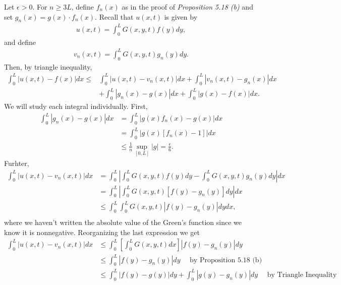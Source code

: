 \begin{questions}
\begin{solution}
Let $\epsilon>0$. For $n\geq 3L$, define $f_n(x)$ as in the proof of \textsl{Proposition 5.18 (b)} and set $g_n(x)=g(x)\cdot f_n(x)$. Recall that $u(x,t)$ is given by 
\begin{align*}
u(x,t)=\int_0^LG(x,y,t)f(y)dy,
\end{align*}
and define
\begin{align*}
v_n(x,t)=\int_0^LG(x,y,t)g_n(y)dy.
\end{align*}
Then, by triangle inequality,
\begin{align*}
\int_0^L|u(x,t)-f(x)|dx\leq& \int_0^L|u(x,t)-v_n(x,t)|dx+\int_0^L|v_n(x,t)-g_n(x)|dx\\
&+\int_0^L|g_n(x)-g(x)|dx+\int_0^L|g(x)-f(x)|dx.
\end{align*}
We will study each integral individually. First,
\begin{align*}
\int_0^L|g_n(x)-g(x)|dx&=\int_0^L|g(x)f_n(x)-g(x)|dx\\
&=\int_0^L|g(x)[f_n(x)-1]|dx\\
&\leq \frac{1}{n}\sup_{[0,L]}|g|=\frac{\epsilon}{6}.
\end{align*}
Furhter,
\begin{align*}
\int_0^L|u(x,t)-v_n(x,t)|dx&=\int_0^L\left|\int_0^LG(x,y,t)f(y)dy-\int_0^LG(x,y,t)g_n(y)dy\right|dx\\
&=\int_0^L\left|\int_0^LG(x,y,t)\left[f(y)-g_n(y)\right]dy\right|dx\\
&\leq\int_0^L\int_0^LG(x,y,t)\left|f(y)-g_n(y)\right|dydx,\\
\end{align*}
where we haven't written the absolute value of the Green's function since we know it is nonnegative. Reorganizing the last expression we get
\begin{align*}
\int_0^L|u(x,t)-v_n(x,t)|dx&\leq\int_0^L\left[\int_0^LG(x,y,t)dx\right]\left|f(y)-g_n(y)\right|dy\\
&\leq\int_0^L\left|f(y)-g_n(y)\right|dy~~~~~~\text{by Proposition 5.18 (b)}\\
&\leq\int_0^L\left|f(y)-g(y)\right|dy+\int_0^L\left|g(y)-g_n(y)\right|dy~~~~~~\text{by Triangle Inequality}\\

\end{align*}
\end{solution}
\end{questions}
